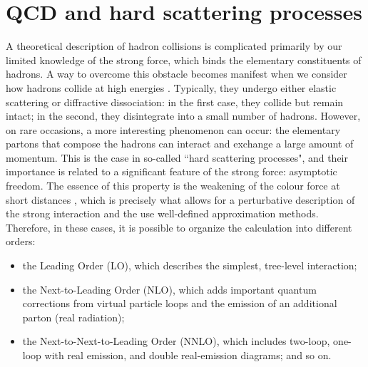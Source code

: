 \documentclass[a4paper, 12pt]{book}
\begin{document}
\section{QCD and hard scattering processes}
A theoretical description of hadron collisions is complicated primarily by our limited knowledge of the strong force, which binds the elementary constituents of hadrons. A way to overcome this obstacle becomes manifest when we consider how hadrons collide at high energies \cite{Asteriadis2020}. Typically, they undergo either elastic scattering or diffractive dissociation: in the first case, they collide but remain intact; in the second, they disintegrate into a small number of hadrons. However, on rare occasions, a more interesting phenomenon can occur: the elementary partons that compose the hadrons can interact and exchange a large amount of momentum. This is the case in so-called ``hard scattering processes", and their importance is related to a significant feature of the strong force: asymptotic freedom. The essence of this property is the weakening of the colour force at short distances \cite{ellis}, which is precisely what allows for a perturbative description of the strong interaction and the use well-defined approximation methods. Therefore, in these cases, it is possible to organize the calculation into different orders: 
\begin{itemize}
    \item the Leading Order (LO), which describes the simplest, tree-level interaction;
    \item the Next-to-Leading Order (NLO), which adds important quantum corrections from virtual particle loops and the emission of an additional parton (real radiation);
    \item the Next-to-Next-to-Leading Order (NNLO), which includes two-loop, one-loop with real emission, and double real-emission diagrams; and so on.
\end{itemize}
\end{document}
